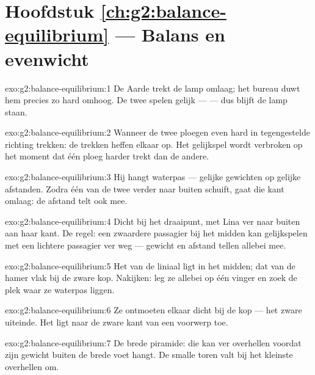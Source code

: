 \section*{Hoofdstuk \ref{ch:g2:balance-equilibrium} --- Balans en evenwicht}

\begin{solution}{exo:g2:balance-equilibrium:1}
De Aarde trekt de lamp omlaag; het bureau duwt hem precies zo hard
omhoog. De twee  spelen gelijk ---  --- dus blijft de
lamp staan.
\end{solution}

\begin{solution}{exo:g2:balance-equilibrium:2}
Wanneer de twee ploegen even hard in tegengestelde richting trekken:
de trekken heffen elkaar op. Het gelijkspel wordt verbroken op het
moment dat één ploeg harder trekt dan de andere.
\end{solution}

\begin{solution}{exo:g2:balance-equilibrium:3}
Hij hangt waterpas --- gelijke gewichten op gelijke afstanden. Zodra
één van de twee verder naar buiten schuift, gaat die kant omlaag: de
afstand telt ook mee.
\end{solution}

\begin{solution}{exo:g2:balance-equilibrium:4}
Dicht bij het draaipunt, met Lina ver naar buiten aan haar kant. De
regel: een zwaardere passagier bij het midden kan gelijkspelen met een
lichtere passagier ver weg --- gewicht en afstand tellen allebei mee.
\end{solution}

\begin{solution}{exo:g2:balance-equilibrium:5}
Het  van de liniaal ligt in het midden; dat van de hamer
vlak bij de zware kop. Nakijken: leg ze allebei op één vinger en zoek
de plek waar ze waterpas liggen.
\end{solution}

\begin{solution}{exo:g2:balance-equilibrium:6}
Ze ontmoeten elkaar dicht bij de kop --- het zware uiteinde. Het
 ligt naar de zware kant van een voorwerp toe.
\end{solution}

\begin{solution}{exo:g2:balance-equilibrium:7}
De brede piramide: die kan ver overhellen voordat zijn gewicht buiten
de brede voet hangt. De smalle toren valt bij het kleinste
overhellen om.
\end{solution}

